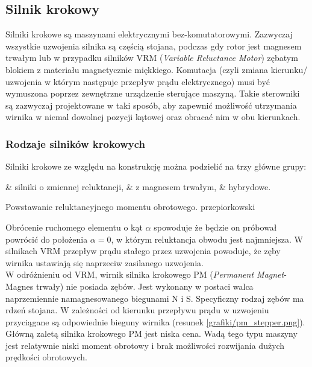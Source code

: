 \subsection{Silnik krokowy}

Silniki krokowe są maszynami elektrycznymi bez-komutatorowymi. Zazwyczaj wszystkie uzwojenia silnika są częścią stojana, podczas gdy rotor jest magnesem trwałym lub w przypadku silników VRM ({\em Variable Reluctance Motor}) zębatym blokiem z materiału magnetycznie miękkiego. Komutacja (czyli zmiana kierunku/ uzwojenia w którym następuje przepływ prądu elektrycznego) musi być wymuszona poprzez zewnętrzne urządzenie sterujące maszyną. Takie sterowniki są zazwyczaj projektowane w taki sposób, aby zapewnić możliwość utrzymania wirnika w niemal dowolnej pozycji kątowej oraz obracać nim w obu kierunkach. 

\subsubsection{Rodzaje silników krokowych}

Silniki krokowe ze względu na konstrukcję można podzielić na trzy główne grupy: 
\begin{easylist}
	& silniki o zmiennej reluktancji,
	& z magnesem trwałym,
	& hybrydowe.
\end{easylist}

		{Powstawanie reluktancyjnego momentu obrotowego.}
		{przepiorkowski}

Obrócenie ruchomego elementu o kąt $ \alpha $ spowoduje że będzie on próbował powrócić do położenia $ \alpha = 0 $, w którym reluktancja obwodu jest najmniejsza. W silnikach VRM przepływ prądu stałego przez uzwojenia powoduje, że zęby wirnika ustawiają się naprzeciw zasilanego uzwojenia. \\

W odróżnieniu od VRM, wirnik silnika krokowego PM ({\em Permanent Magnet}- Magnes trwały) nie posiada zębów. Jest wykonany w postaci walca naprzemiennie namagnesowanego biegunami N i S. Specyficzny rodzaj zębów ma rdzeń stojana. \newline
W zależności od kierunku przepływu prądu w uzwojeniu przyciągane są odpowiednie bieguny wirnika (resunek \ref{grafiki/pm_stepper.png}). Główną zaletą silnika krokowego PM jest niska cena. Wadą tego typu maszyny jest relatywnie niski moment obrotowy i brak możliwości rozwijania dużych prędkości obrotowych. 

\clearpage
	

